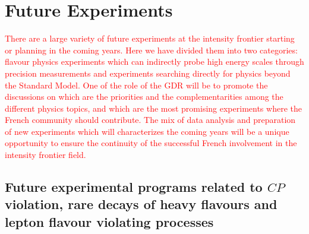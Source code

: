
\section{Future Experiments}

\textcolor{red}{There are a large variety of future experiments at the intensity frontier starting or planning in the coming years. Here we have divided them into two categories:  flavour physics experiments which can indirectly probe high energy scales through precision measurements and experiments searching directly for physics beyond the Standard Model. One of the role of the GDR will be to promote the discussions on  which are the priorities and the complementarities among the different physics topics, and which are the most promising experiments  where the French community should  contribute. The mix of data analysis and preparation of new experiments which will characterizes the coming years will be a unique opportunity to ensure the continuity of the successful French involvement in the intensity frontier field. }






\subsection{Future experimental programs related to $CP$ violation, rare decays of heavy flavours and lepton flavour violating processes}   

